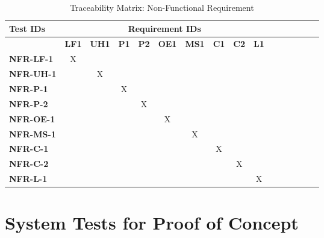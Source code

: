 \documentclass[12pt, titlepage]{article}
\begin{document}
\begin{table}[H]
    \centering
    \caption{Traceability Matrix: Non-Functional Requirement}
    \begin{adjustbox}{max width=0.7\paperwidth}
    \begin{tabular}{l|ccccccccccccccc}
        \textbf{Test IDs} & \multicolumn{9}{c}{\textbf{Requirement IDs}}\\
        \hline
        ~ & \textbf{LF1} & \textbf{UH1} & \textbf{P1} & \textbf{P2} & \textbf{OE1}
        & \textbf{MS1} & \textbf{C1} & \textbf{C2} & \textbf{L1}\\
        \textbf{NFR-LF-1}  & X & ~ & ~ & ~ & ~ & ~ & ~ & ~ & ~\\
        \textbf{NFR-UH-1}  & ~ & X & ~ & ~ & ~ & ~ & ~ & ~ & ~\\
        \textbf{NFR-P-1}   & ~ & ~ & X & ~ & ~ & ~ & ~ & ~ & ~\\
        \textbf{NFR-P-2}   & ~ & ~ & ~ & X & ~ & ~ & ~ & ~ & ~\\
        \textbf{NFR-OE-1}  & ~ & ~ & ~ & ~ & X & ~ & ~ & ~ & ~\\
        \textbf{NFR-MS-1}  & ~ & ~ & ~ & ~ & ~ & X & ~ & ~ & ~\\
        \textbf{NFR-C-1}   & ~ & ~ & ~ & ~ & ~ & ~ & X & ~ & ~\\
        \textbf{NFR-C-2}   & ~ & ~ & ~ & ~ & ~ & ~ & ~ & X & ~\\
        \textbf{NFR-L-1}   & ~ & ~ & ~ & ~ & ~ & ~ & ~ & ~ & X\\
    \end{tabular}
    \end{adjustbox}
    \label{Traceability Matrix: Non-Functional Requirement}
\end{table}

\section{System Tests for Proof of Concept}
\end{document}
